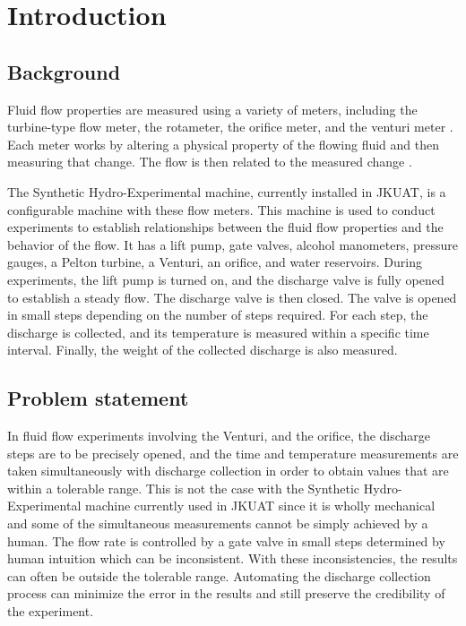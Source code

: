 \section{Introduction}
\label{sec:introduction}
\subsection{Background}
Fluid flow properties are measured using a variety of meters, including the turbine-type flow meter, the rotameter, the orifice meter, and the venturi meter \cite{pereira2009flow}. Each meter works by altering a physical property of the flowing fluid and then measuring that change. The flow is then related to the measured change \cite{miller1983flow}.
\par
The Synthetic Hydro-Experimental machine, currently installed in JKUAT, is a configurable machine with these flow meters. This machine is used to conduct experiments to establish relationships between the fluid flow properties and the behavior of the flow. It has a lift pump, gate valves, alcohol manometers, pressure gauges, a Pelton turbine, a Venturi, an orifice, and water reservoirs.  During experiments, the lift pump is turned on, and the discharge valve is fully opened to establish a steady flow.  The discharge valve is then closed. The valve is opened in small steps depending on the number of steps required. For each step, the discharge is collected, and its temperature is measured within a specific time interval. Finally, the weight of the collected discharge is also measured.

\subsection{Problem statement}

In fluid flow experiments involving the Venturi, and the orifice, the discharge steps are to be precisely opened, and the time and temperature measurements are taken simultaneously with discharge collection in order to obtain values that are within a tolerable range. This is not the case with the Synthetic Hydro-Experimental machine currently used in JKUAT since it is wholly mechanical and some of the simultaneous measurements cannot be simply achieved by a human. The flow rate is controlled by a gate valve in small steps determined by human intuition which can be inconsistent. With these inconsistencies, the results can often be outside the tolerable range. Automating the discharge collection process can minimize the error in the results and still preserve the credibility of the experiment. 


